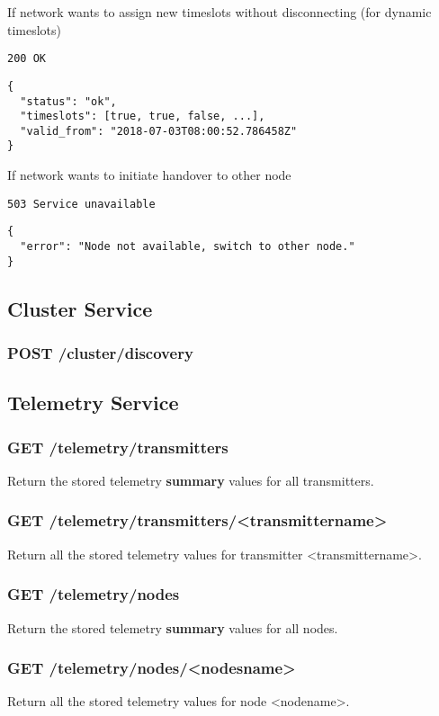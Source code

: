 If network wants to assign new timeslots without disconnecting (for dynamic timeslots)

\texttt{200 OK}
\begin{lstlisting}
{
  "status": "ok",
  "timeslots": [true, true, false, ...],
  "valid_from": "2018-07-03T08:00:52.786458Z"
}
\end{lstlisting}

If network wants to initiate handover to other node

\texttt{503 Service unavailable}
\begin{lstlisting}
{
  "error": "Node not available, switch to other node."
}
\end{lstlisting}


\subsection{Cluster Service}

\subsubsection{POST /cluster/discovery}


\subsection{Telemetry Service}

\subsubsection{GET /telemetry/transmitters}
Return the stored telemetry \textbf{summary} values for all transmitters.

\subsubsection{GET /telemetry/transmitters/<transmittername>}
Return all the stored telemetry values for transmitter <transmittername>.

\subsubsection{GET /telemetry/nodes}
Return the stored telemetry \textbf{summary} values for all nodes.

\subsubsection{GET /telemetry/nodes/<nodesname>}
Return all the stored telemetry values for node <nodename>.

